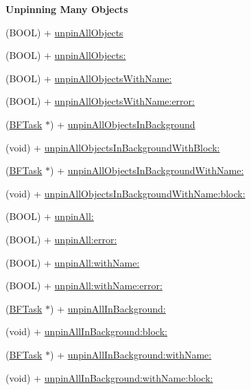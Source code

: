 \begin{Indent}{\bf Unpinning Many Objects}\par
{\em 

 

 }\begin{DoxyCompactItemize}
\item 
(B\+O\+O\+L) + \hyperlink{interface_p_f_object_aefe87d95ee369f03ed416a187aa24011}{unpin\+All\+Objects}
\item 
(B\+O\+O\+L) + \hyperlink{interface_p_f_object_a783bc216a71c8a7bce6d020d4724dc48}{unpin\+All\+Objects\+:}
\item 
(B\+O\+O\+L) + \hyperlink{interface_p_f_object_a360d3e289ac30c51a8b23ac6feeb5de7}{unpin\+All\+Objects\+With\+Name\+:}
\item 
(B\+O\+O\+L) + \hyperlink{interface_p_f_object_a76ff35cff9ce5a28bb4ebb53f454981d}{unpin\+All\+Objects\+With\+Name\+:error\+:}
\item 
(\hyperlink{interface_b_f_task}{B\+F\+Task} $\ast$) + \hyperlink{interface_p_f_object_ad54f6195e60ee955fbe062f2a8e2b7d7}{unpin\+All\+Objects\+In\+Background}
\item 
(void) + \hyperlink{interface_p_f_object_ace8bc38c08f48d9a4c7becb42d4476b7}{unpin\+All\+Objects\+In\+Background\+With\+Block\+:}
\item 
(\hyperlink{interface_b_f_task}{B\+F\+Task} $\ast$) + \hyperlink{interface_p_f_object_a4326eeacda5eb264e65797a0596bdf03}{unpin\+All\+Objects\+In\+Background\+With\+Name\+:}
\item 
(void) + \hyperlink{interface_p_f_object_a3080d544545226eac4240d85d0e6a97d}{unpin\+All\+Objects\+In\+Background\+With\+Name\+:block\+:}
\item 
(B\+O\+O\+L) + \hyperlink{interface_p_f_object_a1445e75e81dc5e0172567dab159a3d4d}{unpin\+All\+:}
\item 
(B\+O\+O\+L) + \hyperlink{interface_p_f_object_a60e33a679c284748821d158ae34a98b2}{unpin\+All\+:error\+:}
\item 
(B\+O\+O\+L) + \hyperlink{interface_p_f_object_ad57a8bb2d17d07fbabaf868315d03319}{unpin\+All\+:with\+Name\+:}
\item 
(B\+O\+O\+L) + \hyperlink{interface_p_f_object_afe8b5e9bff903561a6ab690097f04237}{unpin\+All\+:with\+Name\+:error\+:}
\item 
(\hyperlink{interface_b_f_task}{B\+F\+Task} $\ast$) + \hyperlink{interface_p_f_object_afced3b233c45a765a9cb2a8b25a86485}{unpin\+All\+In\+Background\+:}
\item 
(void) + \hyperlink{interface_p_f_object_a9e306600e8a9957670eb21a8cabc8b50}{unpin\+All\+In\+Background\+:block\+:}
\item 
(\hyperlink{interface_b_f_task}{B\+F\+Task} $\ast$) + \hyperlink{interface_p_f_object_a945befe537909fe0a1b4a0d4c6a409e2}{unpin\+All\+In\+Background\+:with\+Name\+:}
\item 
(void) + \hyperlink{interface_p_f_object_a5f85aa7fc8c7b2f4da2c691d034e9ebf}{unpin\+All\+In\+Background\+:with\+Name\+:block\+:}
\end{DoxyCompactItemize}
\end{Indent}
